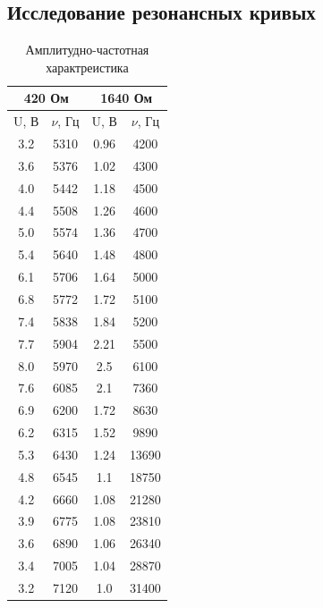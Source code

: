 \documentclass[a4paper,12 pt]{article}
\begin{document}
\subsection{Исследование резонансных кривых}


\begin{table}[H]
    \centering
    \begin{tabular}{|c|c||c|c|}
    \hline
    \multicolumn{2}{|c||}{420 Ом} & \multicolumn{2}{c|}{1640 Ом}  \\
    \hline
    U, В & $\nu$, Гц & U, В & $\nu$, Гц \\
    \hline
         3.2  &  5310  &  0.96  &  4200 \\
\hline
3.6  &  5376  &  1.02  &  4300 \\
\hline
4.0  &  5442  &  1.18  &  4500 \\
\hline
4.4  &  5508  &  1.26  &  4600 \\
\hline
5.0  &  5574  &  1.36  &  4700 \\
\hline
5.4  &  5640  &  1.48  &  4800 \\
\hline
6.1  &  5706  &  1.64  &  5000 \\
\hline
6.8  &  5772  &  1.72  &  5100 \\
\hline
7.4  &  5838  &  1.84  &  5200 \\
\hline
7.7  &  5904  &  2.21  &  5500 \\
\hline
8.0  &  5970  &  2.5  &  6100 \\
\hline
7.6  &  6085  &  2.1  &  7360 \\
\hline
6.9  &  6200  &  1.72  &  8630 \\
\hline
6.2  &  6315  &  1.52  &  9890 \\
\hline
5.3  &  6430  &  1.24  &  13690 \\
\hline
4.8  &  6545  &  1.1  &  18750 \\
\hline
4.2  &  6660  &  1.08  &  21280 \\
\hline
3.9  &  6775  &  1.08  &  23810 \\
\hline
3.6  &  6890  &  1.06  &  26340 \\
\hline
3.4  &  7005  &  1.04  &  28870 \\
\hline
3.2  &  7120  &  1.0  &  31400 \\
\hline 
    \end{tabular}
    \caption{Амплитудно-частотная характреистика}
\end{table}
\end{document}
